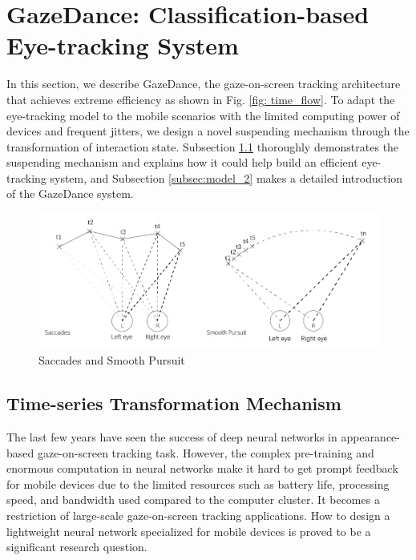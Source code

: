 \documentclass[acmlarge]{acmart}
\begin{document}
\section{GazeDance: Classification-based Eye-tracking System}
In this section, we describe GazeDance, the gaze-on-screen tracking architecture that achieves extreme efficiency as shown in Fig. \ref{fig: time_flow}. To adapt the eye-tracking model to the mobile scenarios with the limited computing power of devices and frequent jitters, we design a novel suspending mechanism through the transformation of interaction state. Subsection \ref{subsec:model_1} thoroughly demonstrates the suspending mechanism and explains how it could help build an efficient eye-tracking system, and Subsection \ref{subsec:model_2} makes a detailed introduction of the GazeDance system.

\begin{figure} 
  \centering
  \includegraphics[scale=0.5]{pictures/types.png}
  \caption{Saccades and Smooth Pursuit}
  \label{fig: eye movement}
\end{figure}

\subsection{Time-series Transformation Mechanism} \label{subsec:model_1}

The last few years have seen the success of deep neural networks in appearance-based gaze-on-screen tracking task\cite{krafka2016eye,huang2017tabletgaze}. However, the complex pre-training and enormous computation in neural networks make it hard to get prompt feedback for mobile devices due to the limited resources such as battery life, processing speed, and bandwidth used compared to the computer cluster. It becomes a restriction of large-scale gaze-on-screen tracking applications. How to design a lightweight neural network specialized for mobile devices is proved to be a significant research question. 
\end{document}
